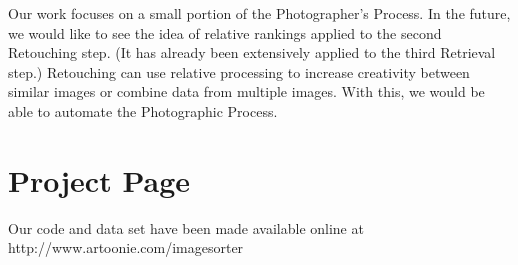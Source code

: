 \documentclass{article}
\begin{document}
Our work focuses on a small portion of the Photographer's Process. In the future, we would like to see the idea of relative rankings applied to the second Retouching step. (It has already been extensively applied to the third Retrieval step.) Retouching can use relative processing to increase creativity between similar images or combine data from multiple images. With this, we would be able to automate the Photographic Process.

\section{Project Page}
Our code and data set have been made available online at http://www.artoonie.com/imagesorter

{\footnotesize
 
 
}
\end{document}
